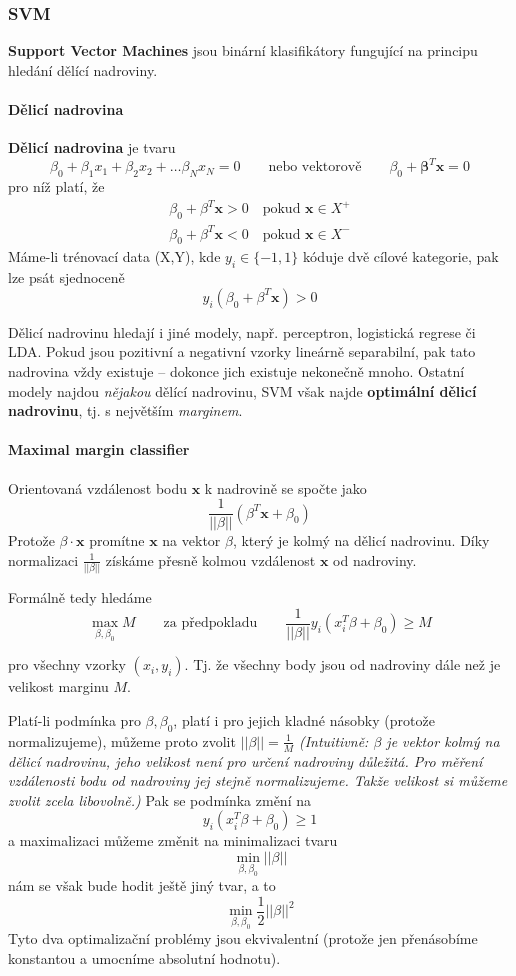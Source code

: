 \documentclass[11pt]{report} %
\renewcommand{\vec}[1]{\mathbf{#1}}
\numberwithin{equation}{section}
\begin{document}
\subsubsection{SVM}
\textbf{Support Vector Machines} jsou binární klasifikátory fungující na principu hledání dělící nadroviny. 

\paragraph{Dělicí nadrovina}
\textbf{Dělicí nadrovina} je tvaru
$$\beta_0 + \beta_1 x_1 + \beta_2 x_2 + \dots \beta_N x_N = 0
\qquad\text{nebo vektorově}\qquad
\beta_0 + \vec{\beta}^T \vec{x} = 0$$
pro níž platí, že 
\begin{align*}
\beta_0 + \beta^T \vec{x} > 0 \quad \text{pokud $\vec{x} \in X^+$} \\
\beta_0 + \beta^T \vec{x} < 0 \quad \text{pokud $\vec{x} \in X^-$} 
\end{align*}
Máme-li trénovací data (X,Y), kde $y_i \in \{-1,1\}$ kóduje dvě cílové kategorie, pak lze psát sjednoceně
$$y_i(\beta_0 + \beta^T \vec{x}) > 0$$

Dělicí nadrovinu hledají i jiné modely, např. perceptron, logistická regrese či LDA. Pokud jsou pozitivní a negativní vzorky lineárně separabilní, pak tato nadrovina vždy existuje -- dokonce jich existuje nekonečně mnoho. Ostatní modely najdou \textit{nějakou} dělící nadrovinu, SVM však najde \textbf{optimální dělicí nadrovinu}, tj. s největším \textit{marginem}. 

\paragraph{Maximal margin classifier}
Orientovaná vzdálenost bodu $\vec{x}$ k nadrovině se spočte jako
$$\frac{1}{||\beta||}(\beta^T\vec{x} + \beta_0)$$
Protože $\beta\cdot\vec{x}$ promítne $\vec{x}$ na vektor $\beta$, který je kolmý na dělicí nadrovinu. Díky normalizaci $\frac{1}{||\beta||}$ získáme přesně kolmou vzdálenost $\vec{x}$ od nadroviny.

Formálně tedy hledáme 
$$\max\limits_{\beta,\beta_0} M
\qquad\text{za předpokladu}\qquad
\frac{1}{||\beta||}y_i(x_i^T\beta + \beta_0) \geq M$$

pro všechny vzorky $(x_i, y_i)$. Tj. že všechny body jsou od nadroviny dále než je velikost marginu $M$. 

Platí-li podmínka pro $\beta,\beta_0$, platí i pro jejich kladné násobky (protože normalizujeme), můžeme proto zvolit $||\beta|| = \frac{1}{M}$ \textit{(Intuitivně: $\beta$ je vektor kolmý na dělicí nadrovinu, jeho velikost není pro určení nadroviny důležitá. Pro měření vzdálenosti bodu od nadroviny jej stejně normalizujeme. Takže velikost si můžeme zvolit zcela libovolně.)} Pak se podmínka změní na 
$$y_i(x_i^T\beta + \beta_0) \geq 1$$
a maximalizaci můžeme změnit na minimalizaci tvaru
$$\min\limits_{\beta,\beta_0} ||\beta||$$
nám se však bude hodit ještě jiný tvar, a to
$$\min\limits_{\beta,\beta_0} \frac{1}{2}||\beta||^2$$
Tyto dva optimalizační problémy jsou ekvivalentní (protože jen přenásobíme konstantou a umocníme absolutní hodnotu).
\end{document}
